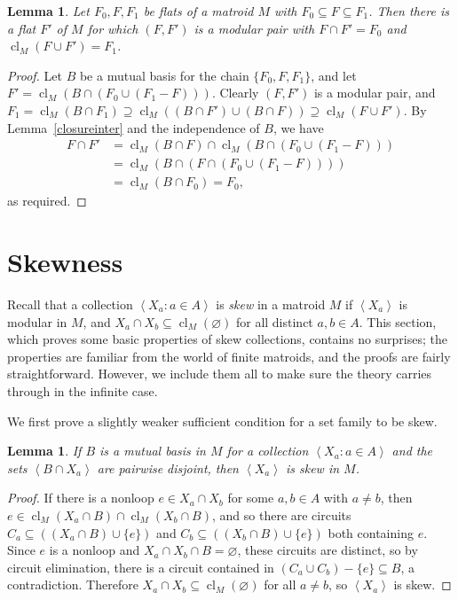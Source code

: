 \documentclass{amsart}
\theoremstyle{plain}
\newtheorem{lemma}[theorem]{Lemma}
\theoremstyle{definition}
\DeclareMathOperator{\cl}{cl}
\newcommand{\ab}[1]{\left\langle#1\right\rangle}
\newcommand{\es}{\varnothing}
\renewcommand{\ss}{\subseteq}
\begin{document}
\begin{lemma}\label{modularcompl}
  Let $F_0, F, F_1$ be flats of a matroid $M$ with $F_0 \ss F \ss F_1$.
  Then there is a flat $F'$ of $M$ for which $(F,F')$ is a modular pair 
  with $F \cap F' = F_0$ and $\cl_M(F \cup F') = F_1$.
\end{lemma}
\begin{proof}
  Let $B$ be a mutual basis for the chain $\{F_0,F,F_1\}$, and let $F' = \cl_M(B \cap (F_0 \cup (F_1 - F)))$. 
  Clearly $(F,F')$ is a modular pair, and $F_1 = \cl_M(B \cap F_1) \supseteq \cl_M((B \cap F') \cup (B \cap F)) \supseteq \cl_M(F \cup F')$. By Lemma~\ref{closureinter} and the independence of $B$, we have 
  \begin{align*}
      F \cap F' &= \cl_M(B \cap F) \cap \cl_M(B \cap (F_0 \cup (F_1 - F))) \\
      & = \cl_M(B \cap (F \cap (F_0 \cup (F_1 - F)))) \\ 
      &= \cl_M(B \cap F_0) = F_0, 
  \end{align*}
  as required. 
\end{proof}


\section{Skewness}\label{skewsec}

Recall that a collection $\ab{X_a : a \in A}$ is \emph{skew} in a matroid $M$ if 
$\ab{X_a}$ is modular in $M$, and $X_a \cap X_b \ss \cl_M(\es)$ for all 
distinct $a,b \in A$. This section, which proves some basic properties of skew collections, 
contains no surprises; 
the properties are familiar from the world of finite matroids, 
and the proofs are fairly straightforward. 
However, we include them all to make sure the theory 
carries through in the infinite case. 

We first prove a slightly weaker sufficient condition for a set family to be skew. 

\begin{lemma}\label{skewofdjbase}
  If $B$ is a mutual basis in $M$ for a collection $\ab{X_a : a \in A}$ and the sets 
  $\ab{B \cap X_a}$ are pairwise disjoint, then $\ab{X_a}$ is skew in $M$. 
\end{lemma}
\begin{proof}
  If there is a nonloop $e \in X_a \cap X_b$ for some $a,b \in A$ with $a \ne b$, then $e \in \cl_M(X_a \cap B) \cap \cl_M(X_b \cap B)$, 
  and so there are circuits $C_a \ss ((X_a \cap B) \cup \{e\})$ and $C_b \ss ((X_b \cap B) \cup \{e\})$ both containing $e$. 
  Since $e$ is a nonloop and $X_a \cap X_b \cap B = \es$, 
  these circuits are distinct, so by circuit elimination, there is a circuit contained in 
  $(C_a \cup C_b) - \{e\} \ss B$, a contradiction. Therefore $X_a \cap X_b \ss \cl_M(\es)$ for all $a \ne b$, so $\ab{X_a}$ is skew. 
\end{proof}
\end{document}
